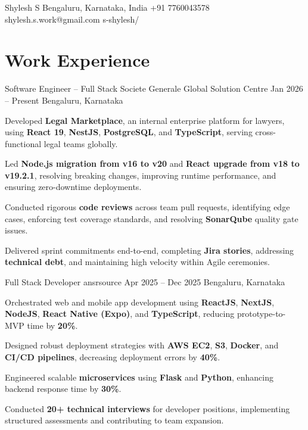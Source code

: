 \documentclass[letterpaper]{resume_config}
\begin{document}
\Header
    {Shylesh S} %
    {Bengaluru, Karnataka, India} %
    {+91 7760043578} %
    {shylesh.s.work@gmail.com} %
    {s-shylesh/} %
    


\section{Work Experience}

\WorkExperience
    {Software Engineer -- Full Stack} %
    {Societe Generale Global Solution Centre} %
    {Jan 2026 -- Present} %
    {Bengaluru, Karnataka} %
    {
        \item Developed \textbf{Legal Marketplace}, an internal enterprise platform for lawyers, using \textbf{React 19}, \textbf{NestJS}, \textbf{PostgreSQL}, and \textbf{TypeScript}, serving cross-functional legal teams globally.
        \item Led \textbf{Node.js migration from v16 to v20} and \textbf{React upgrade from v18 to v19.2.1}, resolving breaking changes, improving runtime performance, and ensuring zero-downtime deployments.
        \item Conducted rigorous \textbf{code reviews} across team pull requests, identifying edge cases, enforcing test coverage standards, and resolving \textbf{SonarQube} quality gate issues.
        \item Delivered sprint commitments end-to-end, completing \textbf{Jira stories}, addressing \textbf{technical debt}, and maintaining high velocity within Agile ceremonies.
    }

\WorkExperience
    {Full Stack Developer} %
    {ansrsource} %
    {Apr 2025 -- Dec 2025} %
    {Bengaluru, Karnataka} %
    {
        \item Orchestrated web and mobile app development using \textbf{ReactJS}, \textbf{NextJS}, \textbf{NodeJS}, \textbf{React Native (Expo)}, and \textbf{TypeScript}, reducing prototype-to-MVP time by \textbf{20\%}.
        \item Designed robust deployment strategies with \textbf{AWS EC2}, \textbf{S3}, \textbf{Docker}, and \textbf{CI/CD pipelines}, decreasing deployment errors by \textbf{40\%}.
        \item Engineered scalable \textbf{microservices} using \textbf{Flask} and \textbf{Python}, enhancing backend response time by \textbf{30\%}.
        \item Conducted \textbf{20+ technical interviews} for developer positions, implementing structured assessments and contributing to team expansion.
    }
\end{document}
